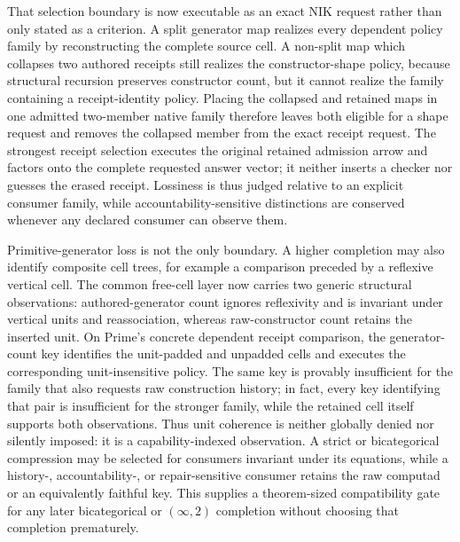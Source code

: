 \documentclass[11pt]{article}
\begin{document}
That selection boundary is now executable as an exact NIK request rather than
only stated as a criterion.  A split generator map realizes every dependent
policy family by reconstructing the complete source cell.  A non-split map
which collapses two authored receipts still realizes the constructor-shape
policy, because structural recursion preserves constructor count, but it
cannot realize the family containing a receipt-identity policy.  Placing the
collapsed and retained maps in one admitted two-member native family therefore
leaves both eligible for a shape request and removes the collapsed member from
the exact receipt request.  The strongest receipt selection executes the
original retained admission arrow and factors onto the complete requested
answer vector; it neither inserts a checker nor guesses the erased receipt.
Lossiness is thus judged relative to an explicit consumer family, while
accountability-sensitive distinctions are conserved whenever any declared
consumer can observe them.

Primitive-generator loss is not the only boundary.  A higher completion may
also identify composite cell trees, for example a comparison preceded by a
reflexive vertical cell.  The common free-cell layer now carries two generic
structural observations: authored-generator count ignores reflexivity and is
invariant under vertical units and reassociation, whereas raw-constructor count
retains the inserted unit.  On Prime's concrete dependent receipt comparison,
the generator-count key identifies the unit-padded and unpadded cells and
executes the corresponding unit-insensitive policy.  The same key is provably
insufficient for the family that also requests raw construction history; in
fact, every key identifying that pair is insufficient for the stronger family,
while the retained cell itself supports both observations.  Thus unit
coherence is neither globally denied nor silently imposed: it is a
capability-indexed observation.  A strict or bicategorical compression may be
selected for consumers invariant under its equations, while a
history-, accountability-, or repair-sensitive consumer retains the raw
computad or an equivalently faithful key.  This supplies a theorem-sized
compatibility gate for any later bicategorical or $(\infty,2)$ completion
without choosing that completion prematurely.
\end{document}
